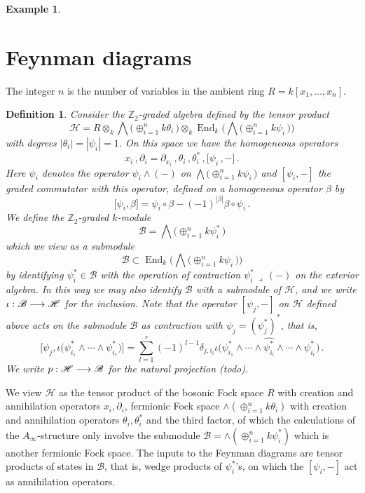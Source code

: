 \documentclass[english,letter paper,12pt,leqno]{article}
\theoremstyle{example}
\newtheorem{definition}[theorem]{Definition}
\newtheorem{example}[theorem]{Example}
\numberwithin{equation}{section}
\def\be{\begin{equation}}
\def\ee{\end{equation}}
\def\nZ{\mathds{Z}}
\DeclareMathOperator{\End}{End}
\begin{document}
\begin{example}
\end{example}

\section{Feynman diagrams}

The integer $n$ is the number of variables in the ambient ring $R = k[x_1,\ldots,x_n]$. 

\begin{definition} Consider the $\nZ_2$-graded algebra defined by the tensor product
\[
\mathscr{H} = R \otimes_k \bigwedge\big( \oplus_{i=1}^n k \theta_i \,\big) \otimes_k \End_k\Big( \bigwedge\big( \oplus_{i=1}^n k \psi_i \, \big) \Big)
\]
with degrees $|\theta_i| = |\psi_i| = 1$. On this space we have the homogeneous operators
\[
x_i\,, \partial_i = \partial_{x_i}\,, \theta_i\,, \theta_i^*\,, \big[\psi_i\,,-\big]\,.
\]
Here $\psi_i$ denotes the operator $\psi_i \wedge (-)$ on $\bigwedge\big( \oplus_{i=1}^n k \psi_i \, \big)$ and $[ \psi_i, - ]$ the graded commutator with this operator, defined on a homogeneous operator $\beta$ by
\[
\big[ \psi_i, \beta \big] = \psi_i \circ \beta - (-1)^{|\beta|} \beta \circ \psi_i\,.
\]
We define the $\nZ_2$-graded $k$-module
\[
\mathscr{B} = \bigwedge\big( \oplus_{i=1}^n k \psi_i^* \,\big)
\]
which we view as a submodule
\[
\mathscr{B} \subset \End_k\Big( \bigwedge\big( \oplus_{i=1}^n k \psi_i \, \big) \Big)
\]
by identifying $\psi_i^* \in \mathscr{B}$ with the operation of contraction $\psi_i^*\, \lrcorner\, (-)$ on the exterior algebra. In this way we may also identify $\mathscr{B}$ with a submodule of $\mathscr{H}$, and we write $\iota: \mathscr{B} \longrightarrow \mathscr{H}$ for the inclusion. Note that the operator $[\psi_j, -]$ on $\mathscr{H}$ defined above acts on the submodule $\mathscr{B}$ as contraction with $\psi_j = (\psi_j^*)^*$, that is,
\be\label{eq:comm_is_ann}
\Big[ \psi_j, \iota\big(\psi_{i_1}^* \wedge \cdots \wedge \psi_{i_r}^*\big) \Big] = \sum_{l=1}^r (-1)^{l-1} \delta_{j, i_l} \iota\big(\psi_{i_1}^* \wedge \cdots \wedge \widehat{ \psi_{i_l}^* } \wedge \cdots \wedge \psi_{i_r}^*\big)\,.
\ee
We write $p: \mathscr{H} \longrightarrow \mathscr{B}$ for the natural projection (todo).
\end{definition}

We view $\mathscr{H}$ as the tensor product of the bosonic Fock space $R$ with creation and annihilation operators $x_i, \partial_i$, fermionic Fock space $\wedge( \oplus_{i=1}^n k \theta_i )$ with creation and annihilation operators $\theta_i, \theta_i^*$ and the third factor, of which the calculations of the $A_\infty$-structure only involve the submodule $\mathscr{B} = \wedge( \oplus_{i=1}^n k \psi_i^* )$ which is another fermionic Fock space. The inputs to the Feynman diagrams are tensor products of states in $\mathscr{B}$, that is, wedge products of $\psi_i^*$'s, on which the $[\psi_i, -]$ act as annihilation operators.
\end{document}
